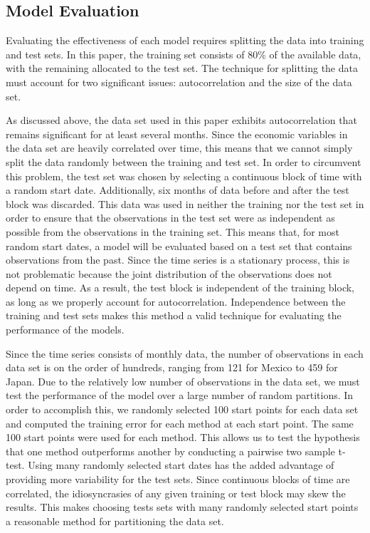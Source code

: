 \documentclass{sig-alternate-05-2015}
\begin{document}
\subsection{Model Evaluation}
Evaluating the effectiveness of each model requires splitting the data into training and test sets. In this paper, the training set consists of 80\% of the available data, with the remaining allocated to the test set. The technique for splitting the data must account for two significant issues: autocorrelation and the size of the data set.
\par{} As discussed above, the data set used in this paper exhibits autocorrelation that remains significant for at least several months. Since the economic variables in the data set are heavily correlated over time, this means that we cannot simply split the data randomly between the training and test set. In order to circumvent this problem, the test set was chosen by selecting a continuous block of time with a random start date. Additionally, six months of data before and after the test block was discarded. This data was used in neither the training nor the test set in order to ensure that the observations in the test set were as independent as possible from the observations in the training set. This means that, for most random start dates, a model will be evaluated based on a test set that contains observations from the past. Since the time series is a stationary process, this is not problematic because the joint distribution of the observations does not depend on time. As a result, the test block is independent of the training block, as long as we properly account for autocorrelation. Independence between the training and test sets makes this method a valid technique for evaluating the performance of the models.
\par{} Since the time series consists of monthly data, the number of observations in each data set is on the order of hundreds, ranging from 121 for Mexico to 459 for Japan. Due to the relatively low number of observations in the data set, we must test the performance of the model over a large number of random partitions. In order to accomplish this, we randomly selected 100 start points for each data set and computed the training error for each method at each start point. The same 100 start points were used for each method. This allows us to test the hypothesis that one method outperforms another by conducting a pairwise two sample t-test. Using many randomly selected start dates has the added advantage of providing more variability for the test sets. Since continuous blocks of time are correlated, the idiosyncrasies of any given training or test block may skew the results. This makes choosing tests sets with many randomly selected start points a reasonable method for partitioning the data set.
\end{document}
